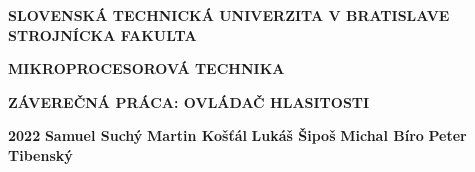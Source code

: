 \renewcommand\thepage{\roman{page}}
\thispagestyle{empty}

\noindent \begin{center}
\textbf{{\large{}SLOVENSKÁ TECHNICKÁ UNIVERZITA V BRATISLAVE}}\\
\textbf{{\large{}STROJNÍCKA FAKULTA}}\textbf{\large{} }\\
\vspace{3cm}
\par\end{center}

\noindent \begin{center}
\vspace{3cm}
\par\end{center}



\begin{center}
\textbf{\textsc{\Large{}MIKROPROCESOROVÁ TECHNIKA}}\\
\par\end{center}{\Large \par}

\begin{center}
\textbf{\large{}ZÁVEREČNÁ PRÁCA: OVLÁDAČ HLASITOSTI  }\\
\par\end{center}{\large \par}





\vfill
\noindent \textbf{\normalsize{}2022} 
\noindent \textbf{\normalsize{}  Samuel Suchý}
\noindent \textbf{\normalsize{}  Martin Košťál}
\noindent \textbf{\normalsize{}  Lukáš Šipoš}
\noindent \textbf{\normalsize{}  Michal Bíro}
\noindent \textbf{\normalsize{} Peter Tibenský}
\cleardoublepage
